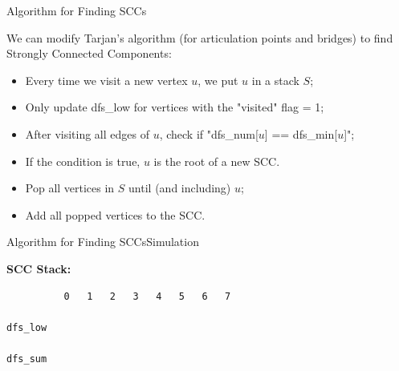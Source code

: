 \begin{frame}{Algorithm for Finding SCCs}

  We can modify Tarjan's algorithm (for articulation points and bridges) to find Strongly Connected Components:\bigskip

  \begin{block}{}
  \begin{itemize}
    \item Every time we visit a new vertex $u$, we put $u$ in a stack $S$;
    \item Only update dfs\_low for vertices with the "visited" flag = 1;
    \item After visiting all edges of $u$, check if "dfs\_num[$u$] == dfs\_min[$u$]";
    \item If the condition is true, $u$ is the root of a new SCC.
    \item Pop all vertices in $S$ until (and including) $u$;
    \item Add all popped vertices to the SCC.
  \end{itemize}
  \end{block}
\end{frame}

\begin{frame}[fragile]{Algorithm for Finding SCCs}{Simulation}
  \begin{center}
  \end{center}
  \bigskip
  {\bf SCC Stack:}\bigskip

\begin{verbatim}
          0   1   2   3   4   5   6   7

dfs_low

dfs_sum
\end{verbatim}

\end{frame}

